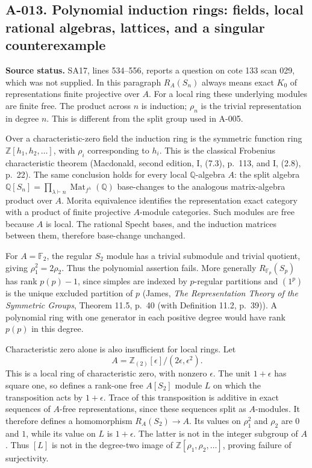 
\subsection*{A-013. Polynomial induction rings: fields, local rational algebras, lattices, and a singular counterexample}
\textbf{Source status.} SA17, lines 534--556, reports a question on
cote 133 scan 029, which was not supplied. In this paragraph $R_A(S_n)$
always means exact $K_0$ of representations finite projective over $A$.
For a local ring these underlying modules are finite free. The product
across $n$ is induction; $\rho_n$ is the trivial representation in degree
$n$. This is different from the split group used in A-005.

Over a characteristic-zero field the induction ring is the symmetric
function ring $\mathbb Z[h_1,h_2,\ldots]$, with $\rho_i$ corresponding to
$h_i$. This is the classical Frobenius characteristic theorem (Macdonald, second edition, I, (7.3), p.~113, and I, (2.8), p.~22). The same
conclusion holds for every local $\mathbb Q$-algebra $A$: the split
algebra $\mathbb Q[S_n]=\prod_{\lambda\vdash n}\operatorname{Mat}_{f^\lambda}(\mathbb Q)$
base-changes to the analogous matrix-algebra product over $A$.
Morita equivalence identifies the representation exact category with a
product of finite projective $A$-module categories. Such modules are
free because $A$ is local. The rational Specht bases, and the induction
matrices between them, therefore base-change unchanged.

For $A=\mathbb F_2$, the regular $S_2$ module has a trivial submodule
and trivial quotient, giving $\rho_1^2=2\rho_2$. Thus the polynomial
assertion fails. More generally $R_{\mathbb F_p}(S_p)$ has rank
$p(p)-1$, since simples are indexed by $p$-regular partitions and
$(1^p)$ is the unique excluded partition of $p$ (James, \emph{The
Representation Theory of the Symmetric Groups}, Theorem 11.5, p.~40 (with Definition 11.2, p.~39)). A polynomial ring with one generator in each
positive degree would have rank $p(p)$ in this degree.

Characteristic zero alone is also insufficient for local rings.
Let
\[
 A=\mathbb Z_{(2)}[\epsilon]/(2\epsilon,\epsilon^2).
\]
This is a local ring of characteristic zero, with nonzero $\epsilon$.
The unit $1+\epsilon$ has square one, so defines a rank-one free
$A[S_2]$ module $L$ on which the transposition acts by $1+\epsilon$.
Trace of this transposition is additive in exact sequences of
$A$-free representations, since these sequences split as $A$-modules.
It therefore defines a homomorphism $R_A(S_2)\to A$. Its values on
$\rho_1^2$ and $\rho_2$ are $0$ and $1$, while its value on $L$ is
$1+\epsilon$. The latter is not in the integer subgroup of $A$.
Thus $[L]$ is not in the degree-two image of
$\mathbb Z[\rho_1,\rho_2,\ldots]$, proving failure of surjectivity.

